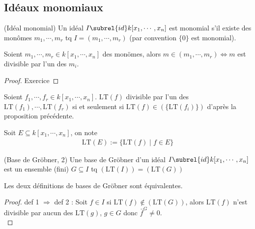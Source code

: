         \subsection{Idéaux monomiaux}
            \begin{defi} (Idéal monomial)
                Un idéal $I \subrel{id} k[x_1, \cdots, x_n]$ est monomial s'il existe des monômes $m_1, \cdots, m_r$ tq $I = (m_1, \cdots, m_r)$ (par convention $\{0\}$ est monomial).
            \end{defi}
            \begin{prop}
                Soient $m_1, \cdots, m_r \in k[x_1, \cdots, x_n]$ des monömes, alors $m \in (m_1, \cdots, m_r) \iff m$ est divisible par l'un des $m_i$.
            \end{prop}
            \begin{proof}
                Exercice
            \end{proof}
            Soient $f_1, \cdots, f_r \in k[x_1, \cdots, x_n]$. $\mathrm{LT}(f)$ divisible par l'un des $\mathrm{LT}(f_1), \cdots, \mathrm{LT}(f_r)$ si et seulement si $\mathrm{LT}(f) \in (\{\mathrm{LT}(f_i)\})$ d'après la proposition précédente. \\
            \begin{nota}
                Soit $E \subseteq k[x_1, \cdots, x_n]$, on note
                \begin{align*}
                    \mathrm{LT}(E) := \{\mathrm{LT}(f) \mid f \in E\}
                \end{align*}
            \end{nota}
            \begin{defi} (Base de Gröbner, 2)
                Une base de Gröbner d'un idéal $I \subrel{id} k[x_1, \cdots, x_n]$ est un ensemble (fini) $G \subseteq I$ tq $(\mathrm{LT}(I)) = (\mathrm{LT}(G))$
            \end{defi}
            \begin{theo}
                Les deux définitions de bases de Gröbner sont équivalentes.
            \end{theo}
            \begin{proof}
                def 1 $\Rightarrow$ def 2 : Soit $f \in I$ si $\mathrm{LT}(f) \notin (\mathrm{LT}(G))$, alors $\mathrm{LT}(f)$ n'est divisible par aucun des $\mathrm{LT}(g)$, $g \in G$ donc $\bar f^G \neq 0$. \\
            \end{proof}
